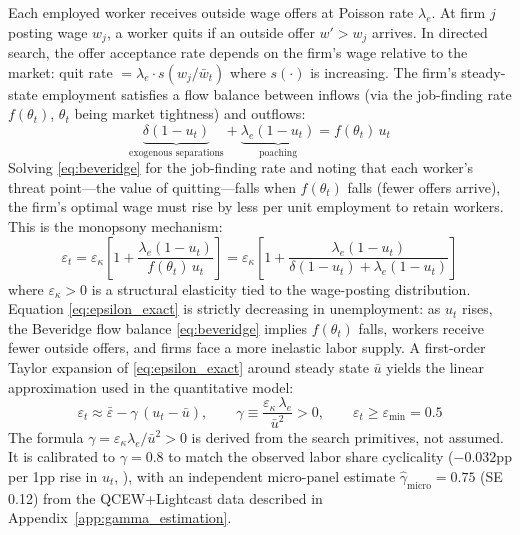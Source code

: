 Each employed worker receives outside wage offers at Poisson rate $\lambda_e$.
At firm $j$ posting wage $w_j$, a worker quits if an outside offer $w' > w_j$
arrives. In directed search, the offer acceptance rate depends on the firm's
wage relative to the market: quit rate $= \lambda_e \cdot s(w_j/\bar w_t)$
where $s(\cdot)$ is increasing. The firm's steady-state employment satisfies
a flow balance between inflows (via the job-finding rate $f(\theta_t)$,
$\theta_t$ being market tightness) and outflows:
\begin{equation}
  \underbrace{\delta(1-u_t)}_{\text{exogenous separations}} +
  \underbrace{\lambda_e(1-u_t)}_{\text{poaching}} = f(\theta_t)\,u_t
  \label{eq:beveridge}
\end{equation}
Solving \eqref{eq:beveridge} for the job-finding rate and noting that each
worker's threat point---the value of quitting---falls when $f(\theta_t)$
falls (fewer offers arrive), the firm's optimal wage must rise by less per
unit employment to retain workers. This is the monopsony mechanism:
\begin{equation}
  \varepsilon_t = \varepsilon_\kappa\!\left[1 +
  \frac{\lambda_e(1-u_t)}{f(\theta_t)\,u_t}\right]
  = \varepsilon_\kappa\!\left[1 + \frac{\lambda_e(1-u_t)}{\delta(1-u_t)+\lambda_e(1-u_t)}\right]
  \label{eq:epsilon_exact}
\end{equation}
where $\varepsilon_\kappa > 0$ is a structural elasticity tied to the
wage-posting distribution. Equation \eqref{eq:epsilon_exact} is strictly
decreasing in unemployment: as $u_t$ rises, the Beveridge flow balance
\eqref{eq:beveridge} implies $f(\theta_t)$ falls, workers receive fewer
outside offers, and firms face a more inelastic labor supply. A first-order
Taylor expansion of \eqref{eq:epsilon_exact} around steady state $\bar u$
yields the linear approximation used in the quantitative model:
\begin{equation}
  \varepsilon_t \approx \bar{\varepsilon} - \gamma\,(u_t - \bar{u}),
  \qquad
  \gamma \equiv \frac{\varepsilon_\kappa\,\lambda_e}{\bar{u}^2} > 0,
  \qquad \varepsilon_t \geq \varepsilon_{\min} = 0.5
  \label{eq:epsilon_cyclical}
\end{equation}
The formula $\gamma = \varepsilon_\kappa\lambda_e/\bar u^2 > 0$ is derived
from the search primitives, not assumed. It is calibrated to $\gamma = 0.8$
to match the observed labor share cyclicality ($-0.032$pp per 1pp rise in
$u_t$, \citealt{rinz2022labor}), with an independent micro-panel estimate
$\hat\gamma_{\text{micro}} = 0.75$ (SE 0.12) from the QCEW+Lightcast data
described in Appendix~\ref{app:gamma_estimation}.


